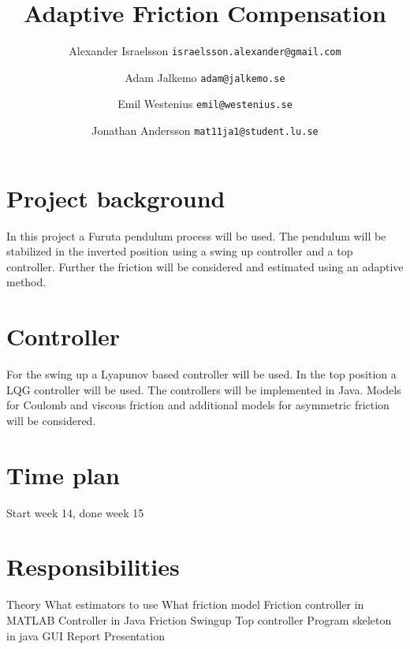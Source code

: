\documentclass[10pt,a4paper]{article}
\author{Alexander Israelsson \texttt{israelsson.alexander@gmail.com} \and
Adam Jalkemo \texttt{adam@jalkemo.se} \and
Emil Westenius \texttt{emil@westenius.se} \and
Jonathan Andersson \texttt{mat11ja1@student.lu.se}}
\title{Adaptive Friction Compensation}
\begin{document}
\maketitle

\section{Project background}
In this project a Furuta pendulum process will be used. The pendulum will be stabilized in the inverted position using a swing up controller and a top controller. Further the friction will be considered and estimated using an adaptive method.

\section{Controller}
For the swing up a Lyapunov based controller will be used. In the top position a LQG controller will be used. The controllers will be implemented in Java.
Models for Coulomb and viscous friction and additional models for asymmetric friction will be considered. 

\section{Time plan}
Start week 14, done week 15

\section{Responsibilities}
Theory
	What estimators to use
	What friction model
Friction controller in MATLAB
Controller in Java
	Friction
	Swingup
	Top controller
Program skeleton in java
GUI
Report
Presentation
\end{document}
